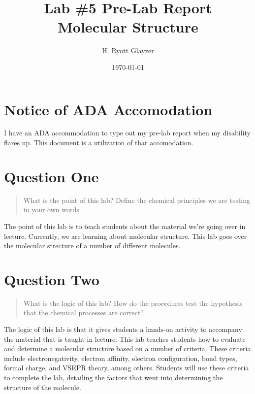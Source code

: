 \documentclass[11pt, letterpaper]{article}
\begin{document}


\title{Lab \#5 Pre-Lab Report \\ \large Molecular Structure}
\author{H. Ryott Glayzer}
\date{\today}


\maketitle


\section*{Notice of ADA Accomodation}
I have an ADA accommodation to type out my pre-lab report when my disability flares up.
This document is a utilization of that accomodation.

\section{Question One}
\begin{quote}
    What is the point of this lab? Define the chemical principles we are testing in your own words.
\end{quote}

The point of this lab is to teach students about the material we're going over in lecture.
Currently, we are learning about molecular structure. 
This lab goes over the molecular strecture of a number of different molecules.

\section{Question Two}
\begin{quote}
    What is the logic of this lab? How do the procedures test the hypothesis that the chemical 
    processes are correct?
\end{quote}

The logic of this lab is that it gives students a hands-on activity to accompany the material 
that is taught in lecture.
This lab teaches students how to evaluate and determine a molecular structure based on
a number of criteria.
These criteria include electronegativity, electron affinity, electron configuration, bond types,
formal charge, and VSEPR theary, among others.
Students will use these criteria to complete the lab, detailing the factors that went into
determining the structure of the molecule.
\end{document}
